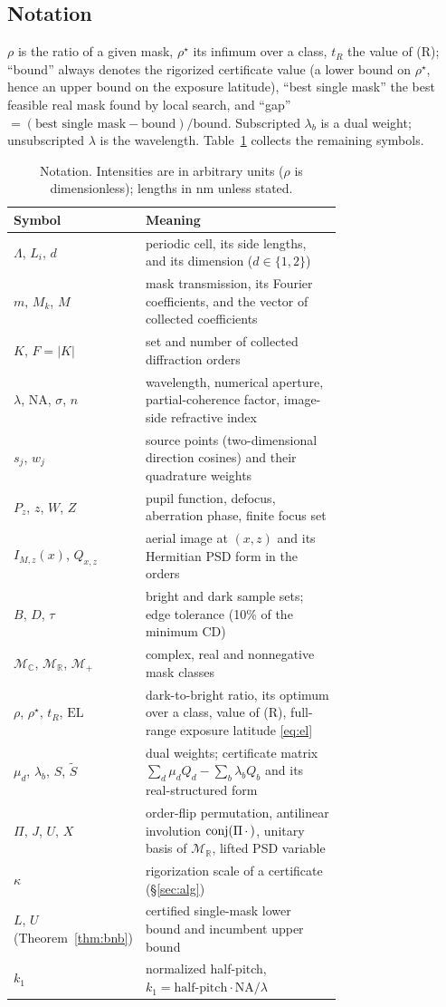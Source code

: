 \documentclass[11pt,a4paper]{article}
\theoremstyle{remark}\newtheorem*{remark}{Remark}
\newcommand{\R}{\mathbb{R}}\newcommand{\C}{\mathbb{C}}\newcommand{\PSD}{\succeq 0}
\newcommand{\I}{I}\newcommand{\rhostar}{\rho^{\star}}\newcommand{\NA}{\mathrm{NA}}\newcommand{\EL}{\mathrm{EL}}
\begin{document}
\subsection{Notation}\label{sec:notation}
$\rho$ is the ratio of a given mask, $\rhostar$ its infimum over a class, $t_R$ the value of (R); ``bound'' always denotes the rigorized certificate value (a lower bound on $\rhostar$, hence an upper bound on the exposure latitude), ``best single mask'' the best feasible real mask found by local search, and ``gap'' $=(\text{best single mask}-\text{bound})/\text{bound}$. Subscripted $\lambda_b$ is a dual weight; unsubscripted $\lambda$ is the wavelength. Table~\ref{tab:notation} collects the remaining symbols.
\begin{table}[tbp]\centering\small
\caption{Notation. Intensities are in arbitrary units ($\rho$ is dimensionless); lengths in nm unless stated.}\label{tab:notation}
\begin{tabular}{@{}lp{0.72\linewidth}@{}}\toprule
Symbol & Meaning\\\midrule
$\Lambda$, $L_i$, $d$ & periodic cell, its side lengths, and its dimension ($d\in\{1,2\}$)\\
$m$, $M_k$, $M$ & mask transmission, its Fourier coefficients, and the vector of collected coefficients\\
$K$, $F=|K|$ & set and number of collected diffraction orders\\
$\lambda$, $\NA$, $\sigma$, $n$ & wavelength, numerical aperture, partial-coherence factor, image-side refractive index\\
$s_j$, $w_j$ & source points (two-dimensional direction cosines) and their quadrature weights\\
$P_z$, $z$, $W$, $Z$ & pupil function, defocus, aberration phase, finite focus set\\
$\I_{M,z}(x)$, $Q_{x,z}$ & aerial image at $(x,z)$ and its Hermitian PSD form in the orders\\
$B$, $D$, $\tau$ & bright and dark sample sets; edge tolerance (10\% of the minimum CD)\\
$\mathcal M_\C$, $\mathcal M_\R$, $\mathcal M_+$ & complex, real and nonnegative mask classes\\
$\rho$, $\rhostar$, $t_R$, $\EL$ & dark-to-bright ratio, its optimum over a class, value of (R), full-range exposure latitude \eqref{eq:el}\\
$\mu_d$, $\lambda_b$, $S$, $\tilde S$ & dual weights; certificate matrix $\sum_d\mu_dQ_d-\sum_b\lambda_bQ_b$ and its real-structured form\\
$\Pi$, $J$, $U$, $X$ & order-flip permutation, antilinear involution $\operatorname{conj}(\Pi\,\cdot\,)$, unitary basis of $\mathcal M_\R$, lifted PSD variable\\
$\kappa$ & rigorization scale of a certificate (\S\ref{sec:alg})\\
$L$, $U$ (Theorem~\ref{thm:bnb}) & certified single-mask lower bound and incumbent upper bound\\
$k_1$ & normalized half-pitch, $k_1=\text{half-pitch}\cdot\NA/\lambda$\\
\bottomrule\end{tabular}\end{table}
\end{document}
